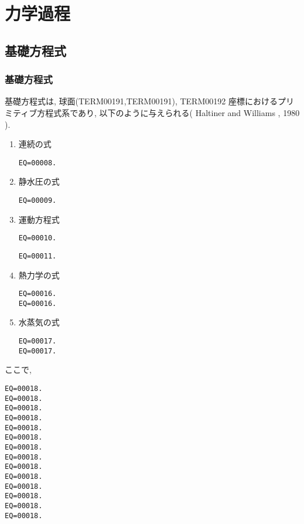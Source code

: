﻿
\section{力学過程}

\subsection{基礎方程式}

\subsubsection{基礎方程式}

基礎方程式は,
球面(TERM00191,TERM00191), TERM00192 座標におけるプリミティブ方程式系であり,
以下のように与えられる( Haltiner and Williams , 1980 ).


\begin{enumerate}
\item 連続の式

\begin{verbatim}
EQ=00008.
\end{verbatim}

\item 静水圧の式

\begin{verbatim}
EQ=00009.
\end{verbatim}


\item 運動方程式

\begin{verbatim}
EQ=00010.
\end{verbatim}
\begin{verbatim}
EQ=00011.
\end{verbatim}


\item 熱力学の式

\begin{verbatim}
EQ=00016.
EQ=00016.
\end{verbatim}


\item 水蒸気の式

\begin{verbatim}
EQ=00017.
EQ=00017.
\end{verbatim}

\end{enumerate}

ここで,
%
\begin{verbatim}
EQ=00018.
EQ=00018.
EQ=00018.
EQ=00018.
EQ=00018.
EQ=00018.
EQ=00018.
EQ=00018.
EQ=00018.
EQ=00018.
EQ=00018.
EQ=00018.
EQ=00018.
EQ=00018.
\end{verbatim}

